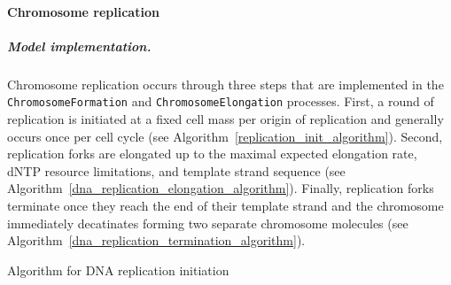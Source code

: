 \documentclass[12pt]{article}
\begin{document}
\baselineskip24pt

\paragraph{Chromosome replication}

\subparagraph{Model implementation.}
Chromosome replication occurs through three steps that are implemented in the \texttt{ChromosomeFormation} and \texttt{ChromosomeElongation} processes. First, a round of replication is initiated at a fixed cell mass per origin of replication and generally occurs once per cell cycle (see Algorithm~\ref{replication_init_algorithm}). Second, replication forks are elongated up to the maximal expected elongation rate, dNTP resource limitations, and template strand sequence  (see Algorithm~\ref{dna_replication_elongation_algorithm}). Finally, replication forks terminate once they reach the end of their template strand and the chromosome immediately decatinates forming two separate chromosome molecules  (see Algorithm~\ref{dna_replication_termination_algorithm}).\\

\begin{algorithm}[H]
\caption{Algorithm for DNA replication initiation}
\label{replication_init_algorithm}

  
  
\end{algorithm}
\end{document}
